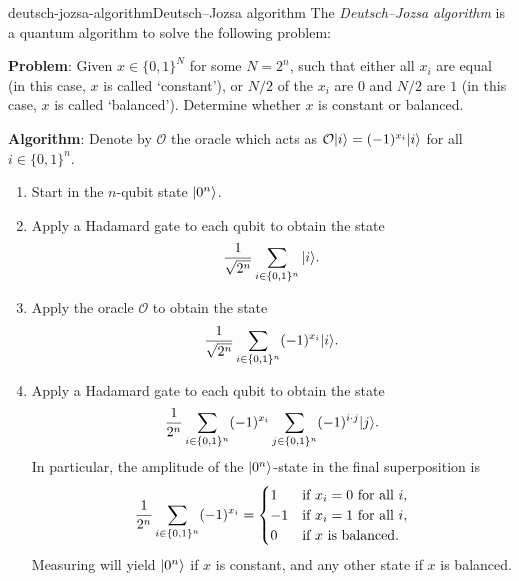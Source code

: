 \begin{topic}{deutsch-jozsa-algorithm}{Deutsch--Jozsa algorithm}
    The \emph{Deutsch--Jozsa algorithm} is a quantum algorithm to solve the following problem:
    
    \textbf{Problem}: Given $x \in \{ 0, 1 \}^N$ for some $N = 2^n$, such that either all $x_i$ are equal (in this case, $x$ is called `constant'), or $N / 2$ of the $x_i$ are $0$ and $N / 2$ are $1$ (in this case, $x$ is called `balanced'). Determine whether $x$ is constant or balanced.
    
    \textbf{Algorithm}: Denote by $\mathcal{O}$ the oracle which acts as $\mathcal{O} |i\rangle = (-1)^{x_i} |i\rangle$ for all $i \in \{ 0, 1 \}^n$.
    \begin{enumerate}[label=(\arabic*)]
        \item Start in the $n$-qubit state $|0^n\rangle$.
        \item Apply a Hadamard gate to each qubit to obtain the state
        \[ \frac{1}{\sqrt{2^n}} \sum_{i \in \{ 0, 1 \}^n } |i\rangle . \]
        \item Apply the oracle $\mathcal{O}$ to obtain the state
        \[ \frac{1}{\sqrt{2^n}} \sum_{i \in \{ 0, 1 \}^n} (-1)^{x_i} |i\rangle . \]
        \item Apply a Hadamard gate to each qubit to obtain the state
        \[ \frac{1}{2^n} \sum_{i \in \{ 0, 1 \}^n} (-1)^{x_i} \sum_{j \in \{ 0, 1 \}^n} (-1)^{i \cdot j} |j\rangle . \]
        In particular, the amplitude of the $|0^n\rangle$-state in the final superposition is
        \[ \frac{1}{2^n} \sum_{i \in \{ 0, 1 \}^n} (-1)^{x_i} = \begin{cases}
            1 & \textup{if } x_i = 0 \textup{ for all } i , \\
            -1 & \textup{if } x_i = 1 \textup{ for all } i , \\
            0 & \textup{if } x \textup{ is balanced} .
        \end{cases} \]
        Measuring will yield $|0^n\rangle$ if $x$ is constant, and any other state if $x$ is balanced.
    \end{enumerate}
\end{topic}

    
